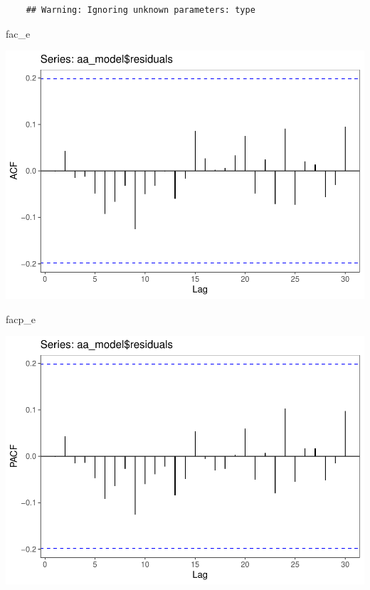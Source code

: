 \documentclass[11pt, a4paper]{report}
\newenvironment{Shaded}{\begin{snugshade}}{\end{snugshade}}
\newcommand{\NormalTok}[1]{#1}
\theoremstyle{plain}
\theoremstyle{plain}
\theoremstyle{remark}
\begin{document}
\begin{verbatim}
	## Warning: Ignoring unknown parameters: type
\end{verbatim}

\begin{Shaded}
	\begin{Highlighting}[]
		\NormalTok{fac_e}
	\end{Highlighting}
\end{Shaded}

\begin{center}\includegraphics{Econo2_P5_files/figure-latex/estimation autoarima-1} \end{center}

\begin{Shaded}
	\begin{Highlighting}[]
		\NormalTok{facp_e}
	\end{Highlighting}
\end{Shaded}

\begin{center}\includegraphics{Econo2_P5_files/figure-latex/estimation autoarima-2} \end{center}
\end{document}
